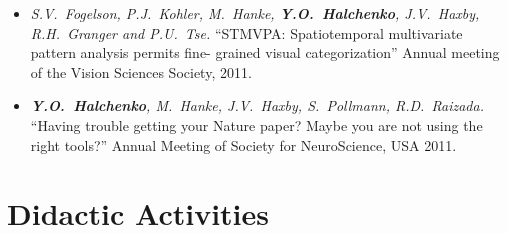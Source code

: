 \documentclass[12pt,overlapped,line]{res}
\newcommand{\mtitle}[1]{``#1''}
\newcommand{\mauthors}[1]{ \textit{#1.}}
\newcommand{\mwhere}[1]{#1.}
\begin{document}
\begin{resume}
\begin{itemize}
 \item
   \mauthors{S.V.~Fogelson, P.J.~Kohler, M.~Hanke, \textbf{Y.O.~Halchenko}, J.V.~Haxby,
     R.H.~Granger and P.U.~Tse}
   \mtitle{STMVPA: Spatiotemporal
     multivariate pattern analysis permits fine- grained visual
     categorization}
   \mwhere{Annual meeting of the Vision Sciences Society, 2011}

 \item
   \mauthors{\textbf{Y.O.~Halchenko}, M.~Hanke, J.V.~Haxby,
     S.~Pollmann, R.D.~Raizada}
   \mtitle{Having trouble getting your Nature paper? Maybe you are not
     using the right tools?}
   \mwhere{Annual Meeting of Society for NeuroScience, USA 2011}

% 
% 

\end{itemize}

\section{Didactic Activities}


\end{resume}
\end{document}
